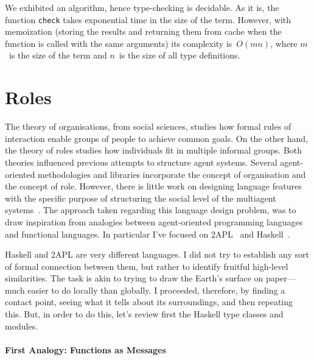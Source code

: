 \documentclass[a4paper,12pt,oneside,fleqn]{book} %
\newcommand{\rg}[1]{\marginpar{\tiny\raggedright\textcolor{blue}{\bf rg:} #1}}
\newcommand{\todo}[1]{[\textcolor{red}{TODO}: #1]}
\renewcommand{\rg}{}
\begin{document}
{We exhibited an algorithm, hence type-checking is decidable. As it is, the
function \verb|check| takes exponential time in the size of the term.
However, with memoization (storing the results and returning them from
cache when the function is called with the same arguments) its complexity
is~$O(mn)$, where $m$~is the size of the term and $n$~is the size of all
type definitions.

\section{Roles}\label{sec:roles} %
The theory of organisations, from social sciences, studies how formal rules
of interaction enable groups of people to achieve common goals. On the
other hand, the theory of roles studies how individuals fit in multiple
informal groups. Both theories influenced previous attempts to structure agent
systems. Several agent-oriented methodologies and libraries incorporate the
concept of organisation and the concept of role.  However, there is little
work on designing language features with the specific purpose of
structuring the social level of the multiagent
systems~\cite{collier2005,DBLP:journals/entcs/BaldoniBT06,DBLP:conf/oopsla/RicciS11}.
The approach taken regarding this language design problem, was to draw
inspiration from analogies between agent-oriented programming languages and
functional languages. In particular I've focused on
2APL~\cite{DBLP:journals/aamas/Dastani08} and Haskell~\cite{web:haskell}.

Haskell and 2APL are very different languages. I did not try to establish
any sort of formal connection between them, but rather to identify fruitful
high-level similarities. The task is akin to trying to draw the Earth's
surface on paper---much easier to do locally than globally. I proceeded,
therefore, by finding a contact point, seeing what it tells about its
surroundings, and then repeating this. But, in order to do this, let's review
first the Haskell type classes and modules.


\paragraph{First Analogy: Functions as Messages} %

}
\end{document}
